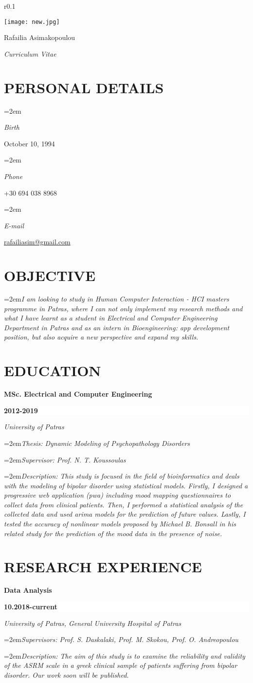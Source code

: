 \documentclass[paper=a4,fontsize=11pt]{scrartcl} %
\newlength{\spacebox}
\newcommand{\sepspace}{\vspace*{1em}}		%
\newcommand{\MyName}[1]{ %
		\LARGE \usefont{OT1}{cmr}{bx}{n} \hfill #1
		\par \normalsize \normalfont}
\newcommand{\MySlogan}[1]{ %
		\large \usefont{OT1}{cmr}{m}{n}\hfill \textit{#1}
		\par \normalsize \normalfont}
\newcommand{\NewPart}[1]{\section*{\large \uppercase{#1}}}
\newcommand{\PersonalEntry}[2]{
		\noindent\hangindent=2em\hangafter=0 %
		\parbox{\spacebox}{        %
		\textit{#1}}		       %
		\hspace{1.5em} #2 \par}    %
\newcommand{\ObjectiveEntry}[1]{
		 \noindent\hangindent=2em\hangafter=0\textit{#1} \par     %
		 }
\newcommand{\EducationEntry}[6]{
		\noindent \textbf{#1} \hfill      %
		\colorbox{White}{%
			\parbox{8em}{%
			\hfill\color{Black}\textbf{#2}}} \par  %
		\noindent \textit{#3} \par        %
		\noindent\hangindent=2em\hangafter=0\textit{#4}\par %
		\noindent\hangindent=2em\hangafter=0\textit{#5}\par %
		\noindent\hangindent=2em\hangafter=0\textit{#6} %
		\normalsize \par}
\newcommand{\ResearchEntry}[5]{
		\noindent \textbf{#1} \hfill      %
		\colorbox{White}{%
			\parbox{12em}{%
			\hfill\color{Black}\textbf{#2}}} \par  %
		\noindent \textit{#3} \par        %
		\noindent\hangindent=2em\hangafter=0\textit{#4}\par %
		\noindent\hangindent=2em\hangafter=0\textit{#5} %
		\normalsize \par}
\begin{document}
\begin{wrapfigure}{r}{0.1\textwidth}
	
		\texttt{[image: new.jpg]}

\end{wrapfigure}

\MyName{Rafailia Asimakopoulou}
\MySlogan{Curriculum Vitae}
\sepspace

\NewPart{Personal details}{}

\PersonalEntry{Birth}{October 10, 1994}
\PersonalEntry{Phone}{+30 694 038 8968}
\PersonalEntry{E-mail}{\href{mailto:rafailiasim@gmail.com}{rafailiasim@gmail.com}}
\sepspace

\NewPart{Objective}{}

\ObjectiveEntry{I am looking to study in Human Computer Interaction - HCI masters programme in Patras, where I can not only implement my research methods and what I have learnt as a student in Electrical and Computer Engineering Department in Patras and as an intern in Bioengineering: app development position, but also acquire a new perspective and expand my skills.}
\sepspace

\NewPart{Education}{}

\EducationEntry{MSc. Electrical and Computer Engineering}{2012-2019}{University of Patras}
{Thesis: Dynamic Modeling of Psychopathology Disorders}
{Supervisor: Prof. N. T. Koussoulas}
{Description: This study is focused in the field of bioinformatics and deals with the modeling of bipolar disorder using statistical models. Firstly, I designed a progressive web application (pwa) including mood mapping questionnaires to collect data from clinical patients. Then, I performed a statistical analysis of the collected data and used arima models for the prediction of future values. Lastly, I tested the accuracy of nonlinear models proposed by Michael B. Bonsall in his related study for the prediction of the mood data in the presence of noise.}
\sepspace

\NewPart{Research experience}{}

\ResearchEntry{Data Analysis}{10.2018-current}{University of Patras, General University Hospital of Patras}
{Supervisors: Prof. S. Daskalaki, Prof. M. Skokou, Prof. O. Andreopoulou}
{Description: The aim of this study is to examine the reliability and validity of the ASRM scale in a greek clinical sample of patients suffering from bipolar disorder. Our work soon will be published.}
\sepspace
\end{document}
